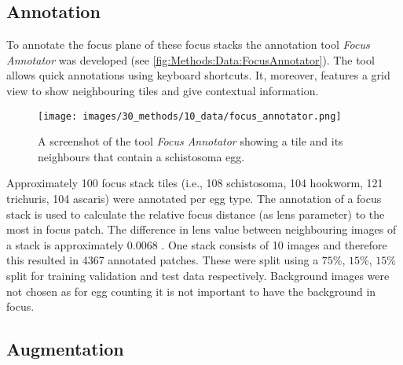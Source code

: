 
\subsection{Annotation}
\label{sec:Methods:Data:Annotation}

To annotate the focus plane of these focus stacks the annotation tool \emph{Focus Annotator} \cite{kuchelmeister2022focus} was developed (see \autoref{fig:Methods:Data:FocusAnnotator}). The tool allows quick annotations using keyboard shortcuts. It, moreover, features a grid view to show neighbouring tiles and give contextual information.

\begin{figure}
    \centering
    \texttt{[image: images/30\_methods/10\_data/focus\_annotator.png]}
    \caption{A screenshot of the tool \emph{Focus Annotator} showing a tile and its neighbours that contain a schistosoma egg.}
    \label{fig:Methods:Data:FocusAnnotator}
\end{figure}


Approximately 100 focus stack tiles (i.e., 108 schistosoma, 104 hookworm, 121 trichuris, 104 ascaris) were annotated per egg type. The annotation of a focus stack is used to calculate the relative focus distance (as lens parameter) to the most in focus patch. The difference in lens value between neighbouring images of a stack is approximately $0.0068$ .  One stack consists of 10 images and therefore this resulted in 4367 annotated patches. These were split using a $75\%$, $15\%$, $15\%$ split for training validation and test data respectively. Background images were not chosen as for egg counting it is not important to have the background in focus.

\subsection{Augmentation}
\label{sec:Methods:Data:Augmentation}

